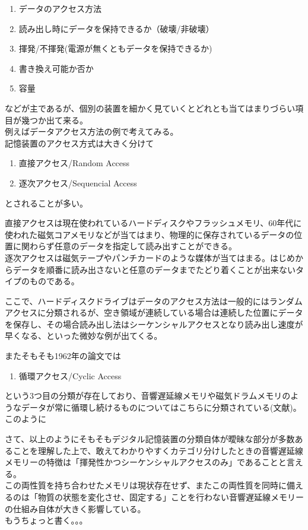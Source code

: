 \begin{enumerate}
\def\labelenumi{\arabic{enumi}.}
\tightlist
\item
  データのアクセス方法
\item
  読み出し時にデータを保持できるか（破壊/非破壊）
\item
  揮発/不揮発(電源が無くともデータを保持できるか)
\item
  書き換え可能か否か
\item
  容量
\end{enumerate}

などが主であるが、個別の装置を細かく見ていくとどれとも当てはまりづらい項目が幾つか出て来る。\\
例えばデータアクセス方法の例で考えてみる。\\
記憶装置のアクセス方式は大きく分けて

\begin{enumerate}
\def\labelenumi{\arabic{enumi}.}
\tightlist
\item
  直接アクセス/Random Access
\item
  逐次アクセス/Sequencial Access
\end{enumerate}

とされることが多い。

直接アクセスは現在使われているハードディスクやフラッシュメモリ、60年代に使われた磁気コアメモリなどが当てはまり、物理的に保存されているデータの位置に関わらず任意のデータを指定して読み出すことができる。\\
逐次アクセスは磁気テープやパンチカードのような媒体が当てはまる。はじめからデータを順番に読み出さないと任意のデータまでたどり着くことが出来ないタイプのものである。

ここで、ハードディスクドライブはデータのアクセス方法は一般的にはランダムアクセスに分類されるが、空き領域が連続している場合は連続した位置にデータを保存し、その場合読み出し法はシーケンシャルアクセスとなり読み出し速度が早くなる、といった微妙な例が出てくる。

またそもそも1962年の論文では

\begin{enumerate}
\def\labelenumi{\arabic{enumi}.}
\tightlist
\item
  循環アクセス/Cyclic Access
\end{enumerate}

という3つ目の分類が存在しており、音響遅延線メモリや磁気ドラムメモリのようなデータが常に循環し続けるものについてはこちらに分類されている(文献)。このように

さて、以上のようにそもそもデジタル記憶装置の分類自体が曖昧な部分が多数あることを理解した上で、敢えてわかりやすくカテゴリ分けしたときの音響遅延線メモリーの特徴は「揮発性かつシーケンシャルアクセスのみ」であることと言える。\\
この両性質を持ち合わせたメモリは現状存在せず、またこの両性質を同時に備えるのは「物質の状態を変化させ、固定する」ことを行わない音響遅延線メモリーの仕組み自体が大きく影響している。\\
もうちょっと書く。。。

